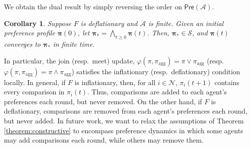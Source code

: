 \documentclass[conference]{ieeeconf}
\newcommand{\N}{\mathcal{N}}
\newcommand{\A}{\mathcal{A}}
\renewcommand{\SS}{\mathcal{S}}
\newcommand{\Pref}{\mathsf{Pre}}
\newcommand{\profile}{\boldsymbol{\pi}}
\newcommand{\join}{\vee}
\newcommand{\meet}{\wedge}
\newcommand{\bigmeet}{\bigwedge}
\renewcommand{\geq}{\geqslant}
\newtheorem{corollary}{Corollary}
\begin{document}
We obtain the dual result by simply reversing the order on $\Pref(\A)$.

\begin{corollary}
    Suppose $F$ is deflationary and $\A$ is finite. Given an initial preference profile $\profile(0)$, let $\profile_{\ast} = \bigmeet_{t \geq 0} \profile(t)$. Then, $\profile_{\ast} \in \SS$, and $\profile(t)$ converges to $\profile_{\ast}$ in finite time.
\end{corollary}

In particular, the join (resp.~meet) update, $\varphi(\pi,\pi_{\text{agg}}) = \pi \join \pi_{\text{agg}}$ (resp.~$\varphi(\pi,\pi_{\text{agg}}) = \pi \meet \pi_{\text{agg}}$) satisfies the inflationary (resp.~deflationary) condition locally. In general, if $F$ is inflationary, then, for all $i \in \N$, $\pi_i(t+1)$ contains every comparison in $\pi_i(t)$. Thus, comparisons are added to each agent's preferences each round, but never removed. On the other hand, if $F$ is deflationary, comparisons are removed from each agent's preferences each round, but never added. In future work, we want to relax the assumptions of Theorem \ref{theorem:constructive} to encompass preference dynamics in which some agents may add comparisons each round, while others may remove them.


\end{document}
